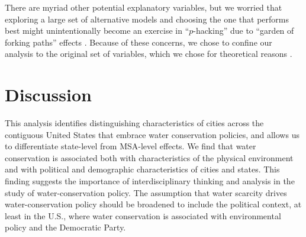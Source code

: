 \documentclass[draft,linenumbers]{agujournal}\usepackage{knitr}
\begin{document}
There are myriad other potential explanatory variables,
but we worried that exploring a large set of alternative models
and choosing the one that performs best might
unintentionally become an exercise in ``$p$-hacking'' due to
``garden of forking paths'' effects \citep{gelman:forking.paths:2014}.
Because of these concerns, we chose to confine our analysis to the original set
of variables, which we chose for theoretical reasons
\citep{hess:drought:2016}.

\section{Discussion}

This analysis identifies distinguishing characteristics of cities across the
contiguous United States that embrace water conservation policies, and allows us
to differentiate state-level from MSA-level effects. We find that water
conservation is associated both with characteristics of the physical environment
and with political and demographic
characteristics of cities and states.
This finding suggests the importance of interdisciplinary thinking and
analysis in the study of water-conservation policy. The assumption that
water scarcity drives water-conservation policy should be broadened to include
the political context, at least in the U.S., where water conservation is associated
with environmental policy and the Democratic Party.

%
%
\end{document}
